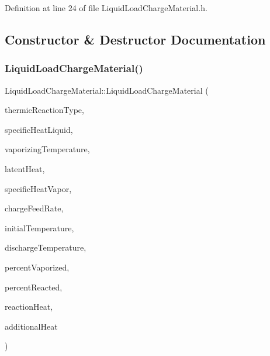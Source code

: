 Definition at line 24 of file Liquid\+Load\+Charge\+Material.\+h.



\subsection{Constructor \& Destructor Documentation}
\mbox{\label{class_liquid_load_charge_material_ab6b2ef342701227c60dc380f5a576085}} 
\subsubsection{\texorpdfstring{Liquid\+Load\+Charge\+Material()}{LiquidLoadChargeMaterial()}\hspace{0.1cm}{\footnotesize\ttfamily [1/3]}}
{\footnotesize\ttfamily Liquid\+Load\+Charge\+Material\+::\+Liquid\+Load\+Charge\+Material (\begin{DoxyParamCaption}\item[{const \hyperlink{namespace_load_charge_material_a51d4263e865a5d86236622dd3fe23fd1}{Load\+Charge\+Material\+::\+Thermic\+Reaction\+Type}}]{thermic\+Reaction\+Type,  }\item[{const double}]{specific\+Heat\+Liquid,  }\item[{const double}]{vaporizing\+Temperature,  }\item[{const double}]{latent\+Heat,  }\item[{const double}]{specific\+Heat\+Vapor,  }\item[{const double}]{charge\+Feed\+Rate,  }\item[{const double}]{initial\+Temperature,  }\item[{const double}]{discharge\+Temperature,  }\item[{const double}]{percent\+Vaporized,  }\item[{const double}]{percent\+Reacted,  }\item[{const double}]{reaction\+Heat,  }\item[{const double}]{additional\+Heat }\end{DoxyParamCaption})\hspace{0.3cm}{\ttfamily [inline]}}

